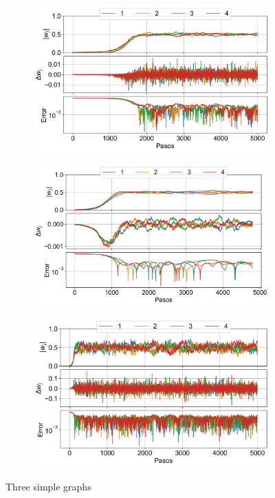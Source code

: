 \documentclass[aps,prb,twocolumn,superscriptaddress,floatfix,longbibliography]{revtex4-2}
\begin{document}
\begin{figure}
    \centering
    \begin{subfigure}[b]{0.45\textwidth}
        \centering
        \includegraphics[width=\textwidth]{ej1_fig1.png}
        \caption{\label{fig:ej1_fig1}}
    \end{subfigure}
    \hfill
    \begin{subfigure}[b]{0.45\textwidth}
        \centering
        \includegraphics[width=\textwidth]{ej1_fig2.png}
        \caption{\label{fig:ej1_fig2}}
    \end{subfigure}
    \hfill
    \begin{subfigure}[b]{0.45\textwidth}
        \centering
        \includegraphics[width=\textwidth]{ej1_fig3.png}
        \caption{\label{fig:ej1_fig3}}
    \end{subfigure}
       \caption{Three simple graphs}
       \label{fig:three graphs}
\end{figure}
\end{document}
